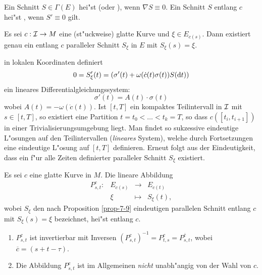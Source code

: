 \begin{Dfn}
  Ein Schnitt $S \in \Gamma(E)$ hei"st  (oder ), wenn $\nabla S \equiv 0$.
  Ein Schnitt $S$ entlang $c$ hei"st , wenn $S' \equiv 0$ gilt.
\end{Dfn}

\begin{Prop}\label{prop-7-9}
  Es sei $c: \operatorname{\mathcal{I}} \to M$ eine (st"uckweise) glatte Kurve und $\xi \in E_{c(s)}$.
  Dann existiert genau ein entlang $c$ paralleler Schnitt $S_\xi$ in $E$ mit $S_\xi(s) = \xi$.
\end{Prop}

\begin{bew}
  in lokalen Koordinaten definiert
  \[ 0 = S_\xi'(t) = (\sigma'(t) + \omega(\dot c(t) \sigma(t)) S(\mathrm{d} t)) \]
  ein lineares Differentialgleichungssystem:
  \[ \sigma'(t)  = A(t) \cdot \sigma(t) \]
  wobei $A(t) = -\omega(\dot c(t))$.
  Ist $[t, T]$ ein kompaktes Teilintervall in $\operatorname{\mathcal{I}}$ mit $s \in [t, T]$, so existiert eine Partition $t = t_0 < \ldots < t_k = T$, so dass $c([t_i, t_{i+1}])$ in einer Trivialisierungsumgebung liegt.
  Man findet so sukzessive eindeutige L"osungen auf den Teilintervallen (\emph{lineares} System), welche durch Fortsetzungen eine eindeutige L"osung auf $[t, T]$ definieren.
  Erneut folgt aus der Eindeutigkeit, dass ein f"ur alle Zeiten definierter paralleler Schnitt $S_\xi$ existiert.
\end{bew}

\begin{Dfn}
  Es sei $c$ eine glatte Kurve in $M$. Die lineare Abbildung
  \[\begin{array}{cccc} P_{s,t}^c: & E_{c(s)} &\to& E_{c(t)} \\
    & \xi &\mapsto& S_\xi(t), \end{array}\]
  wobei $S_\xi$ den nach Proposition \ref{prop-7-9} eindeutigen parallelen Schnitt entlang $c$ mit $S_\xi(s) = \xi$ bezeichnet, hei"st  entlang $c$.
\end{Dfn}

\begin{bem}
  \begin{enumerate}[label=(\arabic*),leftmargin=*]
  \item $P_{s,t}^c$ ist invertierbar mit Inversen $(P_{s,t}^c)^{-1} = P_{t,s}^c = P_{s,t}^{\overline c}$, wobei $\overline c = (s+t-\tau)$.
  \item Die Abbildung $P_{s,t}^c$ ist im Allgemeinen \emph{nicht} unabh"angig von der Wahl von $c$.
  \end{enumerate}
\end{bem}


